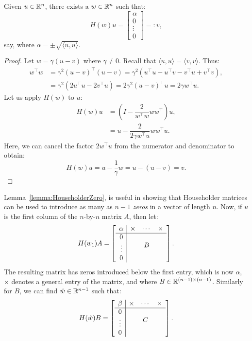 \begin{lemma}\label{lemma:HouseholderZero}
Given $u\in\mathbb{R}^n$, there exists a $w\in\mathbb{R}^n$ such that:
\[
H(w)u = \begin{bmatrix} \alpha\\ 0\\ \vdots\\0\end{bmatrix} =: v,
\]
say, where $\alpha = \pm\sqrt{\langle u,u\rangle}$.
\end{lemma}
\begin{proof}
Let $w = \gamma(u-v)$ where $\gamma\ne0$. Recall that $\langle u,u\rangle = \langle v,v\rangle$. Thus:
\begin{align*}
w^\top w & = \gamma^2(u-v)^\top(u-v) = \gamma^2(u^\top u - u^\top v - v^\top u + v^\top v),\\
& = \gamma^2(2u^\top u -2v^\top u) = 2\gamma^2(u-v)^\top u = 2\gamma w^\top u.
\end{align*}
Let us apply $H(w)$ to $u$:
\begin{align*}
H(w)u & = \left(I-\dfrac{2}{w^\top w}ww^\top\right)u,\\
& = u - \dfrac{2}{2\gamma w^\top u} w w^\top u.
\end{align*}
Here, we can cancel the factor $2w^\top u$ from the numerator and denominator to obtain:
\[
H(w)u = u - \dfrac{1}{\gamma}w = u - (u-v) = v.
\]
\end{proof}
Lemma~\ref{lemma:HouseholderZero}, is useful in showing that Householder matrices can be used to introduce as many as $n-1$ {\em zeros} in a vector of length $n$. 
Now, if $u$ is the first column of the $n$-by-$n$ matrix $A$, then let:
\[
H(w_1)A = \left[\begin{array}{c|ccc} \alpha & \times & \cdots & \times\\ \hline 0 & \multicolumn{3}{c}{\multirow{3}{*}{$B$}}\\ \vdots\\0\\ \end{array}\right].
\]
The resulting matrix has zeros introduced below the first entry, which is now $\alpha$, $\times$ denotes a general entry of the matrix, and where $B\in\mathbb{R}^{(n-1)\times(n-1)}$. Similarly for $B$, we can find $\hat{w}\in\mathbb{R}^{n-1}$ such that:
\[
H(\hat{w})B = \left[\begin{array}{c|ccc} \beta & \times & \cdots & \times\\ \hline 0 & \multicolumn{3}{c}{\multirow{3}{*}{$C$}}\\ \vdots\\0\\ \end{array}\right].
\]
